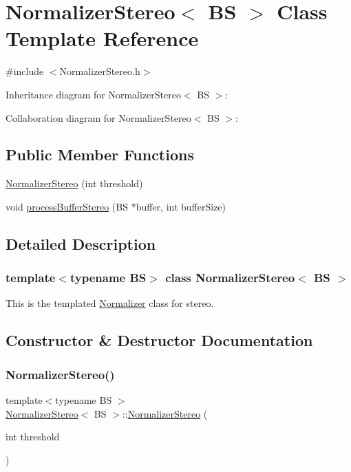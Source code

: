 \hypertarget{classNormalizerStereo}{}\section{Normalizer\+Stereo$<$ BS $>$ Class Template Reference}
\label{classNormalizerStereo}


{\ttfamily \#include $<$Normalizer\+Stereo.\+h$>$}



Inheritance diagram for Normalizer\+Stereo$<$ BS $>$\+:


Collaboration diagram for Normalizer\+Stereo$<$ BS $>$\+:
\subsection*{Public Member Functions}
\begin{DoxyCompactItemize}
\item 
\hyperlink{classNormalizerStereo_a5121f6f5972286a49ce6af7eb7947eb6}{Normalizer\+Stereo} (int threshold)
\item 
void \hyperlink{classNormalizerStereo_af6fb357ed8edaa88898280e1734d933e}{process\+Buffer\+Stereo} (BS $\ast$buffer, int buffer\+Size)
\end{DoxyCompactItemize}


\subsection{Detailed Description}
\subsubsection*{template$<$typename BS$>$\newline
class Normalizer\+Stereo$<$ B\+S $>$}

This is the templated \hyperlink{classNormalizer}{Normalizer} class for stereo. 

\subsection{Constructor \& Destructor Documentation}
\mbox{\label{classNormalizerStereo_a5121f6f5972286a49ce6af7eb7947eb6}} 
\subsubsection{\texorpdfstring{Normalizer\+Stereo()}{NormalizerStereo()}}
{\footnotesize\ttfamily template$<$typename BS $>$ \\
\hyperlink{classNormalizerStereo}{Normalizer\+Stereo}$<$ BS $>$\+::\hyperlink{classNormalizerStereo}{Normalizer\+Stereo} (\begin{DoxyParamCaption}\item[{int}]{threshold }\end{DoxyParamCaption})}

